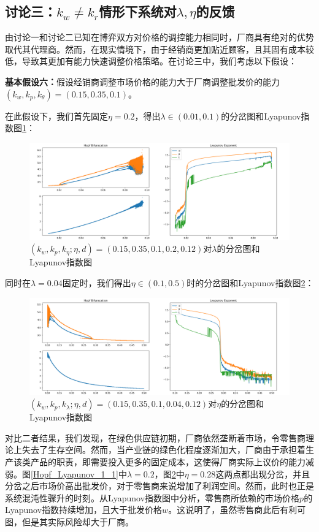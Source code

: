 \documentclass{article}
\begin{document}
\subsection{讨论三：$k_w\neq k_r$情形下系统对$\lambda, \eta$的反馈}
\par 由讨论一和讨论二已知在博弈双方对价格的调控能力相同时，厂商具有绝对的优势取代其代理商。然而，在现实情境下，由于经销商更加贴近顾客，且其固有成本较低，导致其更加有能力快速调整价格策略。在讨论三中，我们考虑以下假设：
\par \textbf{基本假设六：}假设经销商调整市场价格的能力大于厂商调整批发价的能力$(k_w, k_p, k_\theta)=(0.15,0.35,0.1)$。
\par 在此假设下，我们首先固定$\eta=0.2$，得出$\lambda\in(0.01,0.1)$的分岔图和Lyapunov指数图\ref{Hopf_Lyapunov_3_1}：
\begin{figure}[htp]
    \centering
    \includegraphics[width=16.5cm]{Hopf_Lyapunov_3_1.png}
    \caption{$(k_w,k_p,k_\eta;\eta,d)=(0.15,0.35,0.1,0.2,0.12)$对$\lambda$的分岔图和Lyapunov指数图}
    \label{Hopf_Lyapunov_3_1}
\end{figure}
\par 同时在$\lambda=0.04$固定时，我们得出$\eta\in(0.1, 0.5)$时的分岔图和Lyapunov指数图\ref{Hopf_Lyapunov_3_2}：
\begin{figure}[htp]
    \centering
    \includegraphics[width=16.5cm]{Hopf_Lyapunov_3_2.png}
    \caption{$(k_w,k_p,k_\lambda;\eta,d)=(0.15,0.35,0.1,0.04,0.12)$对$\eta$的分岔图和Lyapunov指数图}
    \label{Hopf_Lyapunov_3_2}
\end{figure}
\par 对比二者结果，我们发现，在绿色供应链初期，厂商依然垄断着市场，令零售商理论上失去了生存空间。然而，当产业链的绿色化程度逐渐加大，厂商由于承担着生产该类产品的职责，即需要投入更多的固定成本，这使得厂商实际上议价的能力减弱。图\ref{Hopf_Lyapunov_1_1}中$\lambda=0.2$，图\ref{Hopf_Lyapunov_3_2}中$\eta=0.28$这两点都出现分岔，并且分岔之后市场价高出批发价，对于零售商来说增加了利润空间。然而，此时也正是系统混沌性骤升的时刻。从Lyapunov指数图中分析，零售商所依赖的市场价格$p$的Lyapunov指数持续增加，且大于批发价格$w$。这说明了，虽然零售商此后有利可图，但是其实际风险却大于厂商。
\end{document}
